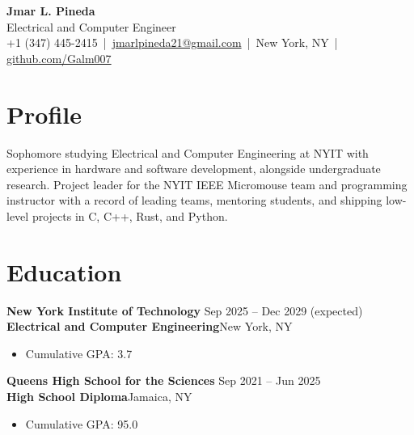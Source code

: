 \documentclass[10pt,letterpaper]{article}
\newcommand{\entry}[4]{%
  \textbf{#1} \hfill {\color{muted}#3}\\
  {\color{accent}\textbf{#2}}\hfill {\color{muted}\small #4}\par}
\begin{document}
{\color{navy}
{\Huge\bfseries Jmar L. Pineda}\\[3pt]
{\large Electrical and Computer Engineer}}\\[4pt]
{\small
+1 (347) 445-2415 \,|\, \href{mailto:jmarlpineda21@gmail.com}{jmarlpineda21@gmail.com} \,|\,
New York, NY \,|\, \href{https://github.com/Galm007}{github.com/Galm007}}

\section{Profile}
Sophomore studying Electrical and Computer Engineering at NYIT with experience in hardware and software
development, alongside undergraduate research. Project leader for the NYIT IEEE Micromouse team and
programming instructor with a record of leading teams, mentoring students, and shipping low-level
projects in C, C++, Rust, and Python.

\section{Education}
\entry{New York Institute of Technology}{Electrical and Computer Engineering}{Sep 2025 -- Dec 2029 (expected)}{New York, NY}
\begin{itemize}
  \item Cumulative GPA: 3.7
\end{itemize}
\vspace{3pt}
\entry{Queens High School for the Sciences}{High School Diploma}{Sep 2021 -- Jun 2025}{Jamaica, NY}
\begin{itemize}
  \item Cumulative GPA: 95.0
\end{itemize}

\end{document}
